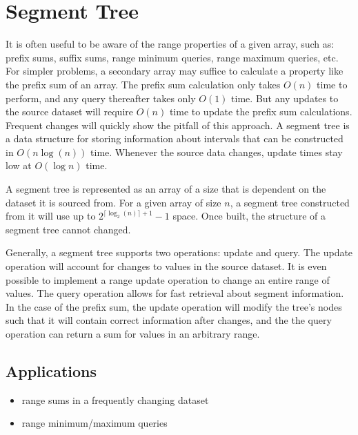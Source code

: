 \section{Segment Tree}


It is often useful to be aware of the range properties of a given array, such as: prefix sums, suffix sums, range minimum queries, range maximum queries, etc.
For simpler problems, a secondary array may suffice to calculate a property like the prefix sum of an array.
The prefix sum calculation only takes $O(n)$ time to perform, and any query thereafter takes only $O(1)$ time.
But any updates to the source dataset will require $O(n)$ time to update the prefix sum calculations.
Frequent changes will quickly show the pitfall of this approach.
A segment tree is a data structure for storing information about intervals that can be constructed in $O(n \log(n))$ time.
Whenever the source data changes, update times stay low at $O(\log n)$ time.


A segment tree is represented as an array of a size that is dependent on the dataset it is sourced from.
For a given array of size $n$, a segment tree constructed from it will use up to $2^{\lceil \log_2 (n)\rceil + 1} - 1$ space.
Once built, the structure of a segment tree cannot changed.


Generally, a segment tree supports two operations: update and query.
The update operation will account for changes to values in the source dataset.
It is even possible to implement a range update operation to change an entire range of values.
The query operation allows for fast retrieval about segment information.
In the case of the prefix sum, the update operation will modify the tree's nodes such that it will contain correct information after changes, and the the query operation can return a sum for values in an arbitrary range.

\subsection{Applications}

\begin{itemize}
    \item range sums in a frequently changing dataset
    \item range minimum/maximum queries
\end{itemize}

